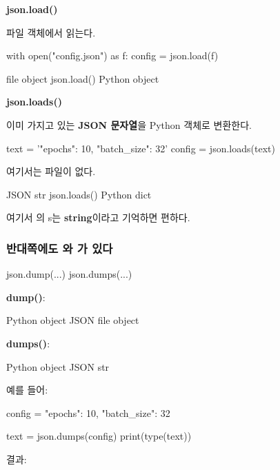 \textbf{json.load()}

파일 객체에서 읽는다.

\begin{dhkcode}
with open("config.json") as f:
    config = json.load(f)
\end{dhkcode}

\begin{dhksmry}[centered]
file object
\da
json.load()
\da
Python object
\end{dhksmry}


\textbf{json.loads()}

이미 가지고 있는 \textbf{JSON 문자열}을 Python 객체로 변환한다.

\begin{dhkzsh}
text = '{"epochs": 10, "batch_size": 32}'
config = json.loads(text)
\end{dhkzsh}

여기서는 파일이 없다.

\begin{dhksmry}[centered]
JSON str
\da
json.loads()
\da
Python dict
\end{dhksmry}

여기서 의 s는 \textbf{string}이라고 기억하면 편하다.

\subsubsection{반대쪽에도 와 가 있다}

\begin{dhkcode}
json.dump(...)
json.dumps(...)
\end{dhkcode}

\textbf{dump()}:

\begin{dhksmry}[centered]
Python object
\da
JSON
\da
file object
\end{dhksmry}

\textbf{dumps()}:

\begin{dhksmry}[centered]
Python object
\da
JSON str
\end{dhksmry}

예를 들어:

\begin{dhkcode}
config = {
    "epochs": 10,
    "batch_size": 32
}

text = json.dumps(config)
print(type(text))
\end{dhkcode}

결과:

